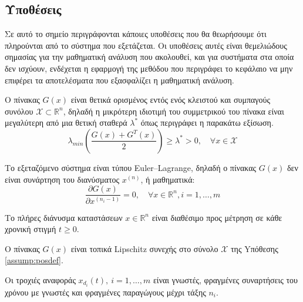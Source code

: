 \subsection{Υποθέσεις} \label{assumptions}
Σε αυτό το σημείο περιγράφονται κάποιες υποθέσεις που θα θεωρήσουμε ότι πληρούνται από το σύστημα που εξετάζεται. Οι υποθέσεις αυτές είναι θεμελιώδους σημασίας για την μαθηματική ανάλυση που ακολουθεί, και για συστήματα στα οποία δεν ισχύουν, ενδέχεται η εφαρμογή της μεθόδου που περιγράφει το κεφάλαιο να μην επιφέρει τα αποτελέσματα που εξασφαλίζει η μαθηματική ανάλυση.\\

\begin{assumption}
\label{assump:posdef}
Ο πίνακας $G(x)$ είναι θετικά ορισμένος εντός ενός κλειστού και συμπαγούς συνόλου $\mathcal{X} \subset \mathbb{R}^n$, δηλαδή η μικρότερη ιδιοτιμή του συμμετρικού του πίνακα είναι μεγαλύτερη από μια θετική σταθερά $\lambda^*$ όπως περιγράφει η παρακάτω εξίσωση.
\begin{equation*}
	\lambda_{min} \left(\frac{G(x) + G^T (x)}{2}\right) \geq \lambda^* > 0
	,\quad \forall x \in \mathcal{X}
	\label{eq:assump_1}
\end{equation*}
\end{assumption}

\begin{assumption}
\label{assump:EL}
Το εξεταζόμενο σύστημα είναι τύπου Euler–Lagrange, δηλαδή ο πίνακας $G(x)$ δεν είναι συνάρτηση του διανύσματος $x^{(n)}$, ή μαθηματικά:
\begin{equation}
	\frac{\partial G(x)}{\partial x^{(n_i-1)}} = 0, \quad \forall x \in \mathbb{R}^n, i = 1,\dots,m
	\label{eq:assump_2}
\end{equation}
\end{assumption}

\begin{assumption}
\label{assump:state_measurements}
Το πλήρες διάνυσμα καταστάσεων $x \in \mathbb{R}^n$ είναι διαθέσιμο προς μέτρηση σε κάθε χρονική στιγμή $t \geq 0$. \newline
\end{assumption}

\begin{assumption} 
	Ο πίνακας $G(x)$ είναι τοπικά Lipschitz συνεχής στο σύνολο $\mathcal{X}$ της Yπόθεσης \ref{assump:posdef}.\\
\end{assumption}

\begin{assumption}
	\label{assumption:desired_trajectory}
	Οι τροχιές αναφοράς $x_{d_i}(t),\: i=1,\dots,m$ είναι γνωστές, φραγμένες συναρτήσεις του χρόνου με γνωστές και φραγμένες παραγώγους μέχρι τάξης $n_i$.\\
\end{assumption}



